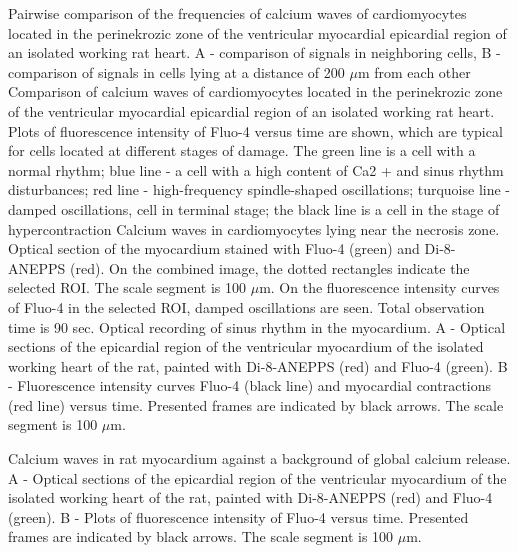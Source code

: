 \documentclass[a4paper,12pt]{article}
\begin{document}
Pairwise comparison of the frequencies of calcium waves of cardiomyocytes located in the perinekrozic zone of the ventricular myocardial epicardial region of an isolated working rat heart. A - comparison of signals in neighboring cells, B - comparison of signals in cells lying at a distance of 200 $\mu$m from each other
Comparison of calcium waves of cardiomyocytes located in the perinekrozic zone of the ventricular myocardial epicardial region of an isolated working rat heart. Plots of fluorescence intensity of Fluo-4 versus time are shown, which are typical for cells located at different stages of damage. The green line is a cell with a normal rhythm; blue line - a cell with a high content of Ca2 + and sinus rhythm disturbances; red line - high-frequency spindle-shaped oscillations; turquoise line - damped oscillations, cell in terminal stage; the black line is a cell in the stage of hypercontraction
Calcium waves in cardiomyocytes lying near the necrosis zone. Optical section of the myocardium stained with Fluo-4 (green) and Di-8-ANEPPS (red). On the combined image, the dotted rectangles indicate the selected ROI. The scale segment is 100 $\mu$m. On the fluorescence intensity curves of Fluo-4 in the selected ROI, damped oscillations are seen. Total observation time is 90 sec.
Optical recording of sinus rhythm in the myocardium. A - Optical sections of the epicardial region of the ventricular myocardium of the isolated working heart of the rat, painted with Di-8-ANEPPS (red) and Fluo-4 (green). B - Fluorescence intensity curves Fluo-4 (black line) and myocardial contractions (red line) versus time. Presented frames are indicated by black arrows. The scale segment is 100 $\mu$m.

Calcium waves in rat myocardium against a background of global calcium release. A - Optical sections of the epicardial region of the ventricular myocardium of the isolated working heart of the rat, painted with Di-8-ANEPPS (red) and Fluo-4 (green). B - Plots of fluorescence intensity of Fluo-4 versus time. Presented frames are indicated by black arrows. The scale segment is 100 $\mu$m.
\end{document}

